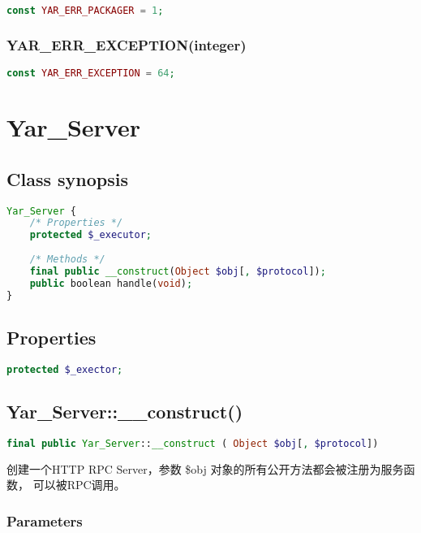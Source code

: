 \begin{lstlisting}[language=PHP]
const YAR_ERR_PACKAGER = 1;
\end{lstlisting}

\subsection{YAR\_ERR\_EXCEPTION(integer)}

\begin{lstlisting}[language=PHP]
const YAR_ERR_EXCEPTION = 64;
\end{lstlisting}


\chapter{Yar\_Server}


\section{Class synopsis}



\begin{lstlisting}[language=PHP]
Yar_Server {
    /* Properties */
    protected $_executor;
    
    /* Methods */
    final public __construct(Object $obj[, $protocol]);
    public boolean handle(void);
}
\end{lstlisting}

\section{Properties}


\begin{lstlisting}[language=PHP]
protected $_exector;
\end{lstlisting}

\section{Yar\_Server::\_\_construct()}



\begin{lstlisting}[language=PHP]
final public Yar_Server::__construct ( Object $obj[, $protocol])
\end{lstlisting}

创建一个HTTP RPC Server，参数 \$obj 对象的所有公开方法都会被注册为服务函数， 可以被RPC调用。 

\subsection{Parameters}


